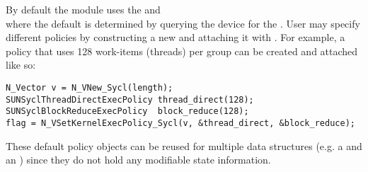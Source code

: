 By default the {\nvecsycl} module uses the 
and \\ \noindent
{} where the default  is
determined by querying the device for the . User may
specify different policies by constructing a new  and
attaching it with . For example, a policy
that uses 128 work-items (threads) per group can be created and attached like
so:

\begin{verbatim}
N_Vector v = N_VNew_Sycl(length);
SUNSyclThreadDirectExecPolicy thread_direct(128);
SUNSyclBlockReduceExecPolicy  block_reduce(128);
flag = N_VSetKernelExecPolicy_Sycl(v, &thread_direct, &block_reduce);
\end{verbatim}

These default policy objects can be reused for multiple {\sundials} data structures
(e.g. a  and an ) since they do not hold any
modifiable state information.
